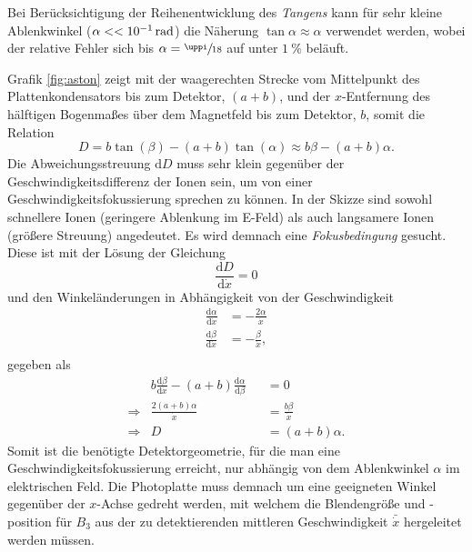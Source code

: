 Bei Berücksichtigung der Reihenentwicklung des \textit{Tangens} kann für sehr kleine Ablenkwinkel ($\alpha << \SI{E-1}{\radian}$) die Näherung $\tan \alpha \approx \alpha$ verwendet werden, wobei der relative Fehler sich bis $\alpha = \sfrac{\uppi}{18}$ auf unter $\SI{1}{\percent}$ beläuft.

Grafik \ref{fig:aston} zeigt mit der waagerechten Strecke vom Mittelpunkt des Plattenkondensators bis zum Detektor, $(a+b)$, und der $x$-Entfernung des hälftigen Bogenmaßes über dem Magnetfeld bis zum Detektor, $b$, somit die Relation
\begin{equation}
\label{eq:aston4}
D= b\tan(\beta)-(a+b)\tan(\alpha)\approx b\beta - (a+b)\alpha.
\end{equation}
Die Abweichungsstreuung $\mathrm{d}D$ muss sehr klein gegenüber der Geschwindigkeitsdifferenz der Ionen sein, um von einer Geschwindigkeitsfokussierung sprechen zu können. In der Skizze sind sowohl schnellere Ionen (geringere Ablenkung im E-Feld) als auch langsamere Ionen (größere Streuung) angedeutet. Es wird demnach eine \textit{Fokusbedingung} gesucht. Diese ist mit der Lösung der Gleichung
\begin{equation}
\frac{\mathrm{d}D}{\mathrm{d}\dot{x}}=0
\end{equation}
und den Winkeländerungen in Abhängigkeit von der Geschwindigkeit 
\begin{equation}
\begin{alignedat}{2}
\label{eq:aston3}
\frac{\mathrm{d}\alpha}{\mathrm{d}\dot{x}} & =-\frac{2\alpha}{\dot{x}}\\
\frac{\mathrm{d}\beta}{\mathrm{d}\dot{x}} & =-\frac{\beta}{\dot{x}},\\
\end{alignedat}
\end{equation}
gegeben als
\begin{equation}
\begin{alignedat}{2}
 & b\frac{\mathrm{d}\beta}{\mathrm{d}\dot{x}}-(a+b)\frac{\mathrm{d}\alpha}{\mathrm{d}\beta}&&=0\\
\Rightarrow&\frac{2(a+b)\alpha}{\dot{x}}&&=\frac{b\beta}{\dot{x}}\\
\Rightarrow& D &&=(a+b)\alpha. 
\end{alignedat}
\end{equation}
Somit ist die benötigte Detektorgeometrie, für die man eine Geschwindigkeitsfokussierung erreicht, nur abhängig von dem Ablenkwinkel $\alpha$ im elektrischen Feld. Die Photoplatte muss demnach um eine geeigneten Winkel gegenüber der $x$-Achse gedreht werden, mit welchem die Blendengröße und -position für $B_3$ aus der zu detektierenden mittleren Geschwindigkeit $\bar{\dot{x}}$ hergeleitet werden müssen. 



